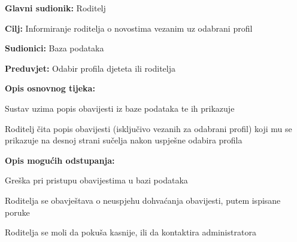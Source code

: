 					\noindent {}
					\begin{packed_item}
						
						\item \textbf{Glavni sudionik: }Roditelj
						\item  \textbf{Cilj:} Informiranje roditelja o novostima vezanim uz odabrani profil
						\item  \textbf{Sudionici:} Baza podataka
						\item  \textbf{Preduvjet:} Odabir profila djeteta ili roditelja
						\item  \textbf{Opis osnovnog tijeka:}
						
						\item[] \begin{packed_enum}
							\item Sustav uzima popis obavijesti iz baze podataka te ih prikazuje
							\item Roditelj čita popis obavijesti (isključivo vezanih za odabrani profil) koji mu se prikazuje na desnoj strani sučelja nakon uspješne odabira profila \\

						\end{packed_enum}
						\item  \textbf{Opis mogućih odstupanja:}
						\item[] \begin{packed_item}
							
							\item[1.a] Greška pri pristupu obavijestima u bazi podataka
							\item[] \begin{packed_enum}
								
								\item Roditelja se obavještava o neuspjehu dohvaćanja obavijesti, putem ispisane poruke
								\item Roditelja se moli da pokuša kasnije, ili da kontaktira administratora
								
							\end{packed_enum}
						\end{packed_item}
					\end{packed_item}
					
